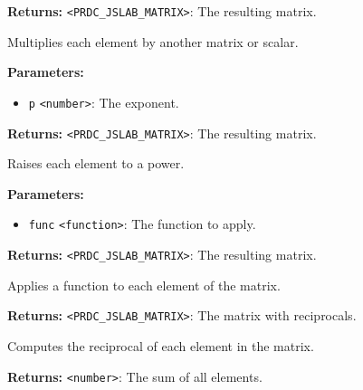 \documentclass[12pt,a4paper]{article}
\begin{document}
\noindent \textbf{Returns:} \texttt{<PRDC\_JSLAB\_MATRIX>}: The resulting matrix.

\noindent Multiplies each element by another matrix or scalar.

\vspace{5mm}
\noindent {}


\noindent \textbf{Parameters:}
\begin{itemize}
  \item \texttt{p} \texttt{<number>}: The exponent.
\end{itemize}

\noindent \textbf{Returns:} \texttt{<PRDC\_JSLAB\_MATRIX>}: The resulting matrix.

\noindent Raises each element to a power.

\vspace{5mm}
\noindent {}


\noindent \textbf{Parameters:}
\begin{itemize}
  \item \texttt{func} \texttt{<function>}: The function to apply.
\end{itemize}

\noindent \textbf{Returns:} \texttt{<PRDC\_JSLAB\_MATRIX>}: The resulting matrix.

\noindent Applies a function to each element of the matrix.

\vspace{5mm}
\noindent {}


\noindent \textbf{Returns:} \texttt{<PRDC\_JSLAB\_MATRIX>}: The matrix with reciprocals.

\noindent Computes the reciprocal of each element in the matrix.

\vspace{5mm}
\noindent {}


\noindent \textbf{Returns:} \texttt{<number>}: The sum of all elements.
\end{document}
